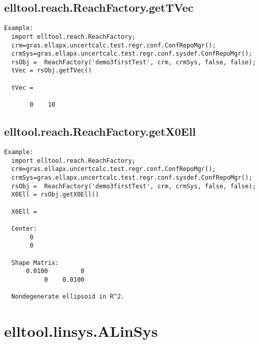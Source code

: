 \subsection{\texorpdfstring{elltool.reach.ReachFactory.getTVec}{getTVec}}\label{method:elltool.reach.ReachFactory.getTVec}
\begin{verbatim}
Example:
  import elltool.reach.ReachFactory;
  crm=gras.ellapx.uncertcalc.test.regr.conf.ConfRepoMgr();
  crmSys=gras.ellapx.uncertcalc.test.regr.conf.sysdef.ConfRepoMgr();
  rsObj =  ReachFactory('demo3firstTest', crm, crmSys, false, false);
  tVec = rsObj.getTVec()

  tVec =

       0    10
\end{verbatim}
\subsection{\texorpdfstring{elltool.reach.ReachFactory.getX0Ell}{getX0Ell}}\label{method:elltool.reach.ReachFactory.getX0Ell}
\begin{verbatim}
Example:
  import elltool.reach.ReachFactory;
  crm=gras.ellapx.uncertcalc.test.regr.conf.ConfRepoMgr();
  crmSys=gras.ellapx.uncertcalc.test.regr.conf.sysdef.ConfRepoMgr();
  rsObj =  ReachFactory('demo3firstTest', crm, crmSys, false, false);
  X0Ell = rsObj.getX0Ell()

  X0Ell =

  Center:
       0
       0

  Shape Matrix:
      0.0100         0
           0    0.0100

  Nondegenerate ellipsoid in R^2.
\end{verbatim}
\section{elltool.linsys.ALinSys}\label{secClassDescr:elltool.linsys.ALinSys}
